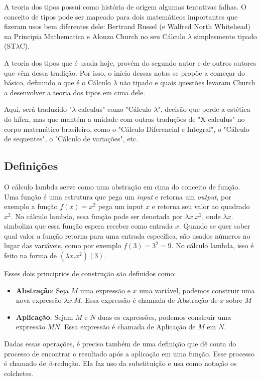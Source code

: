 \documentclass[../main.tex]{subfiles}
\begin{document}
A teoria dos tipos possui como história de origem algumas tentativas falhas. O conceito de tipos pode ser mapeado para dois matemáticos importantes que fizeram usos bem diferentes dele: Bertrand Russel (e Walfred North Whitehead) na Principia Mathematica e Alonzo Church no seu Cálculo $\lambda$ simplesmente tipado (ST$\lambda$C).

A teoria dos tipos que é usada hoje, provém do segundo autor e de outros autores que vêm dessa tradição. Por isso, o início dessas notas se propõe a começar do básico, definindo o que é o Cálculo $\lambda$ não tipado e quais questões levaram Church a desenvolver a teoria dos tipos em cima dele.

Aqui, será traduzido "$\lambda$-calculus" como "Cálculo $\lambda$", decisão que perde a estética do hífen, mas que mantém a unidade com outras traduções de  "X calculus" no corpo matemático brasileiro, como o "Cálculo Diferencial e Integral", o "Cálculo de sequentes", o "Cálculo de variações", etc.

\subsection{Definições}

O cálculo lambda serve como uma abstração em cima do conceito de função. Uma função é uma estrutura que pega um \emph{input} e retorna um \emph{output}, por exemplo a função $f(x) = x^2$ pega um input $x$ e retorna seu valor ao quadrado $x^2$. No cálculo lambda, essa função pode ser denotada por $\lambda x. x^2$, onde $\lambda x .$ simboliza que essa função espera receber como entrada $x$. Quando se quer saber qual valor a função retorna para uma entrada específica, são usados números no lugar das variáveis, como por exemplo $f(3) = 3^2 = 9$. No cálculo lambda, isso é feito na forma de $(\lambda x. x^2)(3)$. 

Esses dois principrios de construção são definidos como:
\begin{itemize}
    \item \textbf{Abstração}: Seja $M$ uma expressão e $x$ uma variável, podemos construir uma nova expressão $\lambda x . M$. Essa expressão é chamada de Abstração de $x$ sobre $M$
    \item \textbf{Aplicação}: Sejam $M$ e $N$ duas es expressões, podemos construir uma expressão $M N$. Essa expressão é chamada de Aplicação de $M$ em $N$.
\end{itemize}

Dadas essas operações, é preciso também de uma definição que dê conta do processo de encontrar o resultado após a aplicação em uma função. Esse processo é chamado de $\beta$-redução. Ela faz uso da substituição e usa como notação os colchetes.
\end{document}
